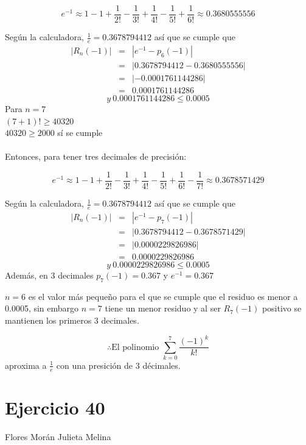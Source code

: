 \documentclass[12pt]{article}
\begin{document}
\[
e^{-1} \approx 1 -1 + \frac{1}{2!} - \frac{1}{3!} + \frac{1}{4!} - \frac{1}{5!}  + \frac{1}{6!} \approx 0.3680555556
\]

Según la calculadora, $\frac{1}{e} = 0.3678794412$
así que se cumple que 
\begin{eqnarray}
\left| R_n (-1)  \right| 
& = & \left| e^{-1}- p_6(-1)  \right|\nonumber
\\
& = & \left| 0.3678794412 - 0.3680555556\right|\nonumber
\\
& = & \left| -0.0001761144286 \right|  \nonumber
\\
& = & 0.0001761144286  \nonumber 
\end{eqnarray}
\[ y ~ 0.0001761144286  \leq 0.0005 \]
Para $n = 7$ \\
$(7+1)! \geq 40320$ \\
$ 40320 \geq  2000$ sí se cumple \\ \\
Entonces, para tener tres decimales de precisión:

\[
e^{-1} \approx 1 -1 + \frac{1}{2!} - \frac{1}{3!} + \frac{1}{4!} - \frac{1}{5!}  + \frac{1}{6!} -  \frac{1}{7!} \approx 0.3678571429
\]

Según la calculadora, $\frac{1}{e} = 0.3678794412$
así que se cumple que 
\begin{eqnarray}
\left| R_n (-1)  \right| 
& = & \left| e^{-1}- p_7(-1)  \right|\nonumber
\\
& = & \left| 0.3678794412 - 0.3678571429\right|\nonumber
\\
& = & \left| 0.0000229826986 \right|  \nonumber
\\
& = & 0.0000229826986 \nonumber 
\end{eqnarray}
\[ y ~ 0.0000229826986  \leq 0.0005 \]
Además, en 3 decimales $p_7(-1) = 0.367$  y $e^{-1} = 0.367 $

$n = 6$ es el valor más pequeño para el que se cumple que el residuo es menor a 0.0005, sin embargo $n=7$  tiene un menor residuo y al ser $ R_7(-1)$ positivo se mantienen los primeros 3 decimales.

\[
\therefore \text{El polinomio } \sum_{k=0}^{7}\frac{(-1)^{k}}{k!} 
\]
aproxima a $\frac{1}{e}$  con una presición de 3 décimales.
\section{Ejercicio 40} Flores Morán Julieta Melina \\
\end{document}
